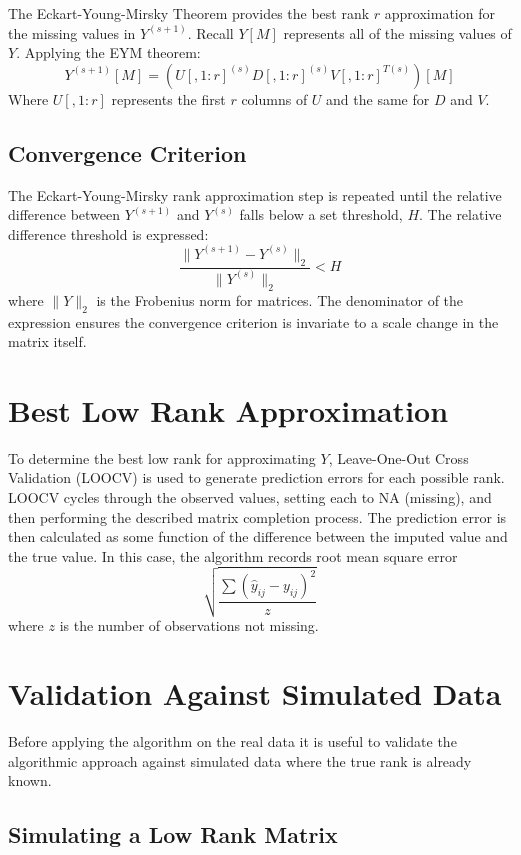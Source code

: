 \documentclass[12pt,twoside]{dukestatscithesis}
\theoremstyle{definition}
\theoremstyle{definition}
\theoremstyle{definition}
\theoremstyle{remark}
\begin{document}
The Eckart-Young-Mirsky Theorem provides the best rank \(r\)
approximation for the missing values in \(Y^{(s+1)}\). Recall \(Y[M]\)
represents all of the missing values of \(Y\). Applying the EYM theorem:
\[Y^{(s+1)}[M] = (U[,1:r]^{(s)}D[,1:r]^{(s)}V[,1:r]^{T(s)})[M]\] Where
\(U[,1:r]\) represents the first \(r\) columns of \(U\) and the same for
\(D\) and \(V\).

\subsection{Convergence Criterion}\label{convergence-criterion}

The Eckart-Young-Mirsky rank approximation step is repeated until the
relative difference between \(Y^{(s+1)}\) and \(Y^{(s)}\) falls below a
set threshold, \(H\). The relative difference threshold is expressed:
\[\frac{\|Y^{(s+1)}-Y^{(s)}\|_2}{\|Y^{(s)}\|_2} < H\] where \(\|Y\|_2\)
is the Frobenius norm for matrices. The denominator of the expression
ensures the convergence criterion is invariate to a scale change in the
matrix itself.

\section{Best Low Rank Approximation}\label{best-low-rank-approximation}

To determine the best low rank for approximating \(Y\), Leave-One-Out
Cross Validation (LOOCV) is used to generate prediction errors for each
possible rank. LOOCV cycles through the observed values, setting each to
NA (missing), and then performing the described matrix completion
process. The prediction error is then calculated as some function of the
difference between the imputed value and the true value. In this case,
the algorithm records root mean square error
\[\sqrt{\frac{\sum (\hat y_{ij} - y_{ij})^2}{z}}\] where \(z\) is the
number of observations not missing.

\section{Validation Against Simulated
Data}\label{validation-against-simulated-data}

Before applying the algorithm on the real data it is useful to validate
the algorithmic approach against simulated data where the true rank is
already known.

\subsection{Simulating a Low Rank
Matrix}\label{simulating-a-low-rank-matrix}
\end{document}
